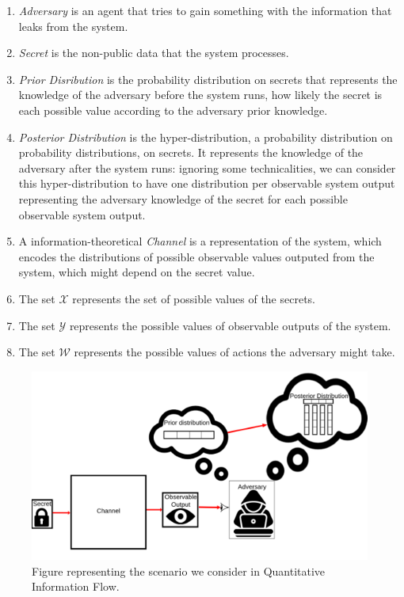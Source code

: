 \begin{enumerate}
\item \emph{Adversary} is an agent that tries to gain something with the information that leaks from the system.
\item \emph{Secret} is the non-public data that the system processes.
\item \emph{Prior Disribution} is the probability distribution on secrets that represents the knowledge of the adversary before the system runs, how likely the secret is each possible value according to the adversary prior knowledge.
\item \emph{Posterior Distribution} is the hyper-distribution, a probability distribution on probability distributions, on secrets. It represents the knowledge of the adversary after the system runs: ignoring some technicalities, we can consider this hyper-distribution to have one distribution per observable system output representing the adversary knowledge of the secret for each possible observable system output.
\item A information-theoretical \emph{Channel} is a representation of the system, which encodes the distributions of possible observable values outputed from the system, which might depend on the secret value.
\item The set $\mathcal{X}$ represents the set of possible values of the secrets.
\item The set $\mathcal{Y}$ represents the possible values of observable outputs of the system.
\item The set $\mathcal{W}$ represents the possible values of actions the adversary might take.
\end{enumerate}

\begin{figure}[ht]
\centering
\includegraphics[width=\textwidth]{channelAndFriends}
\caption{Figure representing the scenario we consider in Quantitative Information Flow.}\label{fig:channelAndFriends}
\end{figure}

